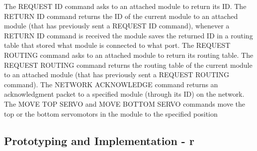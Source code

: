 The REQUEST ID command asks to an attached module to return its ID. The RETURN ID command returns the ID of the current module to an attached module (that has previously sent a REQUEST ID command), whenever a RETURN ID command is received the module saves the returned ID in a routing table that stored what module is connected to what port. The REQUEST ROUTING command asks to an attached module to return its routing table. The REQUEST ROUTING command returns the routing table of the current module to an attached module (that has previously sent a REQUEST ROUTING command). The NETWORK ACKNOWLEDGE command returns an acknowledgment packet to a specified module (through its ID) on the network. The MOVE TOP SERVO and MOVE BOTTOM SERVO commands move the top or the bottom servomotors in the module to the specified position 


\subsection{Prototyping and Implementation - r}